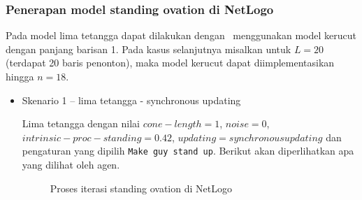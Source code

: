 \subsubsection{Penerapan model standing ovation di NetLogo}

Pada model lima tetangga dapat dilakukan dengan  menggunakan model kerucut dengan panjang barisan 1. Pada kasus selanjutnya misalkan untuk $L=20$ (terdapat 20 baris penonton), maka model kerucut dapat diimplementasikan hingga $n=18$.


\begin{itemize}
	\item Skenario 1 – lima tetangga - synchronous updating

	Lima tetangga dengan nilai $cone-length=1$, $noise=0$, $intrinsic-proc-standing=0.42$, $updating=synchronous updating$ dan pengaturan yang dipilih \texttt{Make guy stand up}. Berikut akan diperlihatkan apa yang dilihat oleh agen.

	\begin{figure}[H]
		\centering
		\hfill
		\hfill
		\hfill
		\caption{Proses iterasi standing ovation di NetLogo}
		\label{fig:proses_sop}
	\end{figure}


\end{itemize}

